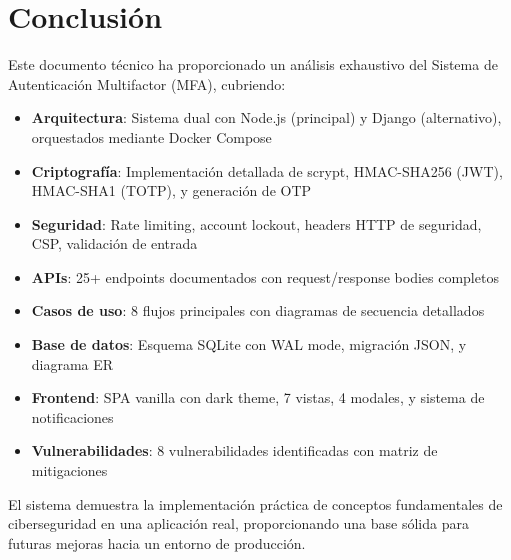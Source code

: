 \documentclass[12pt,a4paper,openany]{article}
\begin{document}
\section{Conclusión}

Este documento técnico ha proporcionado un análisis exhaustivo del Sistema de Autenticación Multifactor (MFA), cubriendo:

\begin{itemize}[leftmargin=*]
    \item \textbf{Arquitectura}: Sistema dual con Node.js (principal) y Django (alternativo), orquestados mediante Docker Compose
    \item \textbf{Criptografía}: Implementación detallada de scrypt, HMAC-SHA256 (JWT), HMAC-SHA1 (TOTP), y generación de OTP
    \item \textbf{Seguridad}: Rate limiting, account lockout, headers HTTP de seguridad, CSP, validación de entrada
    \item \textbf{APIs}: 25+ endpoints documentados con request/response bodies completos
    \item \textbf{Casos de uso}: 8 flujos principales con diagramas de secuencia detallados
    \item \textbf{Base de datos}: Esquema SQLite con WAL mode, migración JSON, y diagrama ER
    \item \textbf{Frontend}: SPA vanilla con dark theme, 7 vistas, 4 modales, y sistema de notificaciones
    \item \textbf{Vulnerabilidades}: 8 vulnerabilidades identificadas con matriz de mitigaciones
\end{itemize}

El sistema demuestra la implementación práctica de conceptos fundamentales de ciberseguridad en una aplicación real, proporcionando una base sólida para futuras mejoras hacia un entorno de producción.
\end{document}
